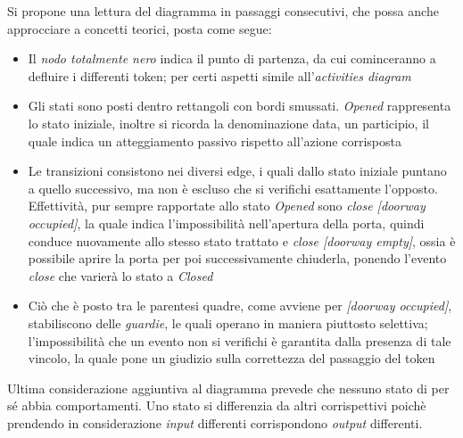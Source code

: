 \documentclass{article}
\begin{document}
Si propone una lettura del diagramma in passaggi consecutivi, che possa anche approcciare a concetti teorici, posta come segue:
\begin{itemize}[label={-}]
    \itemsep0em
    \item Il \textit{nodo totalmente nero} indica il punto di partenza, da cui cominceranno a defluire i differenti token; per certi aspetti simile all'\textit{activities diagram}
    \item Gli stati sono posti dentro rettangoli con bordi smussati. \textit{Opened} rappresenta lo stato iniziale, inoltre si ricorda la denominazione data, un participio, il quale indica un atteggiamento passivo rispetto all'azione corrisposta
    \item Le transizioni consistono nei diversi edge, i quali dallo stato iniziale puntano a quello successivo, ma non è escluso che si verifichi esattamente l'opposto. Effettività, pur sempre rapportate allo stato \textit{Opened} sono \textit{close [doorway occupied]}, la quale indica l'impossibilità nell'apertura della porta, quindi conduce nuovamente allo stesso stato trattato e \textit{close [doorway empty]}, ossia è possibile aprire la porta per poi successivamente chiuderla, ponendo l'evento \textit{close} che varierà lo stato a \textit{Closed} 
    \item Ciò che è posto tra le parentesi quadre, come avviene per \textit{[doorway occupied]}, stabiliscono delle \textit{guardie}, le quali operano in maniera piuttosto selettiva; l'impossibilità che un evento non si verifichi è garantita dalla presenza di tale vincolo, la quale pone un giudizio sulla correttezza del passaggio del token
\end{itemize}
Ultima considerazione aggiuntiva al diagramma prevede che nessuno stato di per sé abbia comportamenti. Uno stato si differenzia da altri corrispettivi poichè prendendo in considerazione \textit{input} differenti corrispondono \textit{output} differenti.
\end{document}
